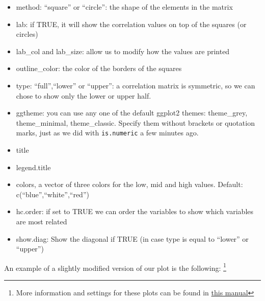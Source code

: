 \documentclass[]{tufte-book}
\newenvironment{Shaded}{}{}
\newcommand{\DataTypeTok}[1]{\textcolor[rgb]{0.56,0.13,0.00}{#1}}
\newcommand{\DecValTok}[1]{\textcolor[rgb]{0.25,0.63,0.44}{#1}}
\newcommand{\KeywordTok}[1]{\textcolor[rgb]{0.00,0.44,0.13}{\textbf{#1}}}
\newcommand{\NormalTok}[1]{#1}
\newcommand{\OperatorTok}[1]{\textcolor[rgb]{0.40,0.40,0.40}{#1}}
\newcommand{\StringTok}[1]{\textcolor[rgb]{0.25,0.44,0.63}{#1}}
\providecommand{\tightlist}{%
  \setlength{\itemsep}{0pt}\setlength{\parskip}{0pt}}
\begin{document}
\begin{itemize}
\tightlist
\item
  method: ``square'' or ``circle'': the shape of the elements in the matrix
\item
  lab: if TRUE, it will show the correlation values on top of the squares (or circles)
\item
  lab\_col and lab\_size: allow us to modify how the values are printed
\item
  outline\_color: the color of the borders of the squares
\item
  type: ``full'',``lower'' or ``upper'': a correlation matrix is symmetric, so we can chose to show only the lower or upper half.
\item
  ggtheme: you can use any one of the default ggplot2 themes: theme\_grey, theme\_minimal, theme\_classic. Specify them without brackets or quotation marks, just as we did with \texttt{is.numeric} a few minutes ago.
\item
  title
\item
  legend.title
\item
  colors, a vector of three colors for the low, mid and high values. Default: c(``blue'',``white'',``red'')
\item
  hc.order: if set to TRUE we can order the variables to show which variables are most related
\item
  show.diag: Show the diagonal if TRUE (in case type is equal to ``lower'' or ``upper'')
\end{itemize}

An example of a slightly modified version of our plot is the following: \footnote{More information and settings for these plots can be found in \href{https://github.com/kassambara/ggcorrplot}{this manual}}

\begin{Shaded}
\end{Shaded}
\end{document}
